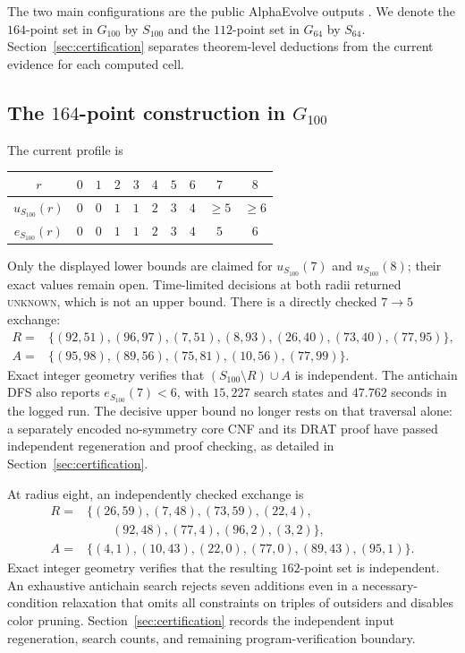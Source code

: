\documentclass[11pt]{article}
\theoremstyle{definition}
\theoremstyle{remark}
\begin{document}
The two main configurations are the public AlphaEvolve outputs
\cite{georgiev2025exploration,alphaevolve59}.  We denote the $164$-point set in
$G_{100}$ by $S_{100}$ and the $112$-point set in $G_{64}$ by $S_{64}$.
Section~\ref{sec:certification} separates theorem-level deductions from the
current evidence for each computed cell.

\subsection{The \texorpdfstring{$164$}{164}-point construction in
\texorpdfstring{$G_{100}$}{G100}}

The current profile is
\begin{center}
\begin{tabular}{c*{9}{c}}
\toprule
$r$ & $0$ & $1$ & $2$ & $3$ & $4$ & $5$ & $6$ & $7$ & $8$\\
\midrule
$u_{S_{100}}(r)$ & $0$ & $0$ & $1$ & $1$ & $2$ & $3$ & $4$ & $\ge5$ & $\ge6$\\
$e_{S_{100}}(r)$ & $0$ & $0$ & $1$ & $1$ & $2$ & $3$ & $4$ & $5$ & $6$\\
\bottomrule
\end{tabular}
\end{center}
Only the displayed lower bounds are claimed for $u_{S_{100}}(7)$ and
$u_{S_{100}}(8)$; their exact values remain open.  Time-limited decisions at
both radii returned \textsc{unknown}, which is not an upper bound.  There is a
directly checked $7\to5$ exchange:
\begin{align*}
R={}&\{(92,51),(96,97),(7,51),(8,93),(26,40),(73,40),(77,95)\},\\
A={}&\{(95,98),(89,56),(75,81),(10,56),(77,99)\}.
\end{align*}
Exact integer geometry verifies that $(S_{100}\setminus R)\cup A$ is
independent.  The antichain DFS also reports $e_{S_{100}}(7)<6$, with
$15{,}227$ search states and $47.762$ seconds in the logged run.  The decisive
upper bound no longer rests on that traversal alone: a separately encoded
no-symmetry core CNF and its DRAT proof have passed independent regeneration
and proof checking, as detailed in Section~\ref{sec:certification}.

At radius eight, an independently checked exchange is
\begin{align*}
R={}&\{(26,59),(7,48),(73,59),(22,4),\\
    &\qquad (92,48),(77,4),(96,2),(3,2)\},\\
A={}&\{(4,1),(10,43),(22,0),(77,0),(89,43),(95,1)\}.
\end{align*}
Exact integer geometry verifies that the resulting $162$-point set is
independent.  An exhaustive antichain search rejects seven additions even in
a necessary-condition relaxation that omits all constraints on triples of
outsiders and disables color pruning.  Section~\ref{sec:certification}
records the independent input regeneration, search counts, and remaining
program-verification boundary.
\end{document}
